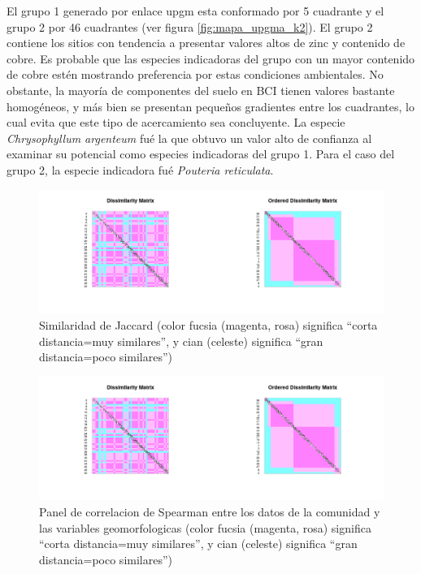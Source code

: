 \documentclass[11pt,]{article}
\begin{document}
El grupo 1 generado por enlace upgm esta conformado por 5 cuadrante y el
grupo 2 por 46 cuadrantes (ver figura \ref{fig:mapa_upgma_k2}). El grupo
2 contiene los sitios con tendencia a presentar valores altos de zinc y
contenido de cobre. Es probable que las especies indicadoras del grupo
con un mayor contenido de cobre estén mostrando preferencia por estas
condiciones ambientales. No obstante, la mayoría de componentes del
suelo en BCI tienen valores bastante homogéneos, y más bien se presentan
pequeños gradientes entre los cuadrantes, lo cual evita que este tipo de
acercamiento sea concluyente. La especie \emph{Chrysophyllum argenteum}
fué la que obtuvo un valor alto de confianza al examinar su potencial
como especies indicadoras del grupo 1. Para el caso del grupo 2, la
especie indicadora fué \emph{Pouteria reticulata}.

\begin{figure}
\centering
\includegraphics[width=1.00000\textwidth]{Similaridad.png}
\caption{Similaridad de Jaccard (color fucsia (magenta, rosa) significa
``corta distancia=muy similares'', y cian (celeste) significa ``gran
distancia=poco similares'')\label{fig:similaridad_jaccard}}
\end{figure}

\begin{figure}
\centering
\includegraphics[width=1.00000\textwidth]{Similaridad.png}
\caption{Panel de correlacion de Spearman entre los datos de la
comunidad y las variables geomorfologicas (color fucsia (magenta, rosa)
significa ``corta distancia=muy similares'', y cian (celeste) significa
``gran distancia=poco
similares'')\label{fig:matriz_correlacion_geomorf_abun_riq_spearman}}
\end{figure}
\end{document}
